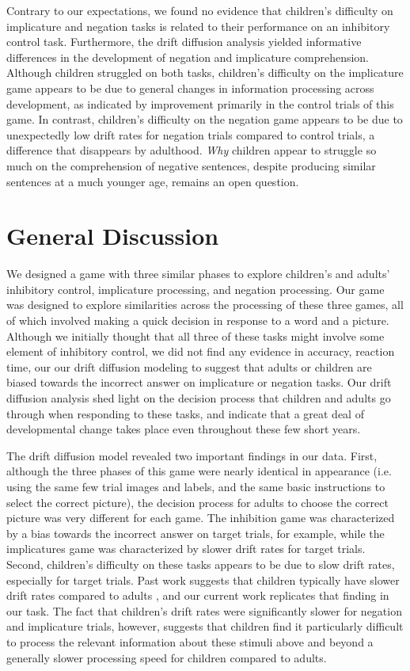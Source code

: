 \documentclass[10pt,letterpaper]{article}
\begin{document}
Contrary to our expectations, we found no evidence that children's difficulty on implicature and negation tasks is related to their performance on an inhibitory control task.  Furthermore, the drift diffusion analysis yielded informative differences in the development of negation and implicature comprehension.  Although children struggled on both tasks, children's difficulty on the implicature game appears to be due to general changes in information processing across development, as indicated by improvement primarily in the control trials of this game.  In contrast, children's difficulty on the negation game appears to be due to unexpectedly low drift rates for negation trials compared to control trials, a difference that disappears by adulthood.  \emph{Why} children appear to struggle so much on the comprehension of negative sentences, despite producing similar sentences at a much younger age, remains an open question.  


\section{General Discussion}

We designed a game with three similar phases to explore children's and adults' inhibitory control, implicature processing, and negation processing.  Our game was designed to explore similarities across the processing of these three games, all of which involved making a quick decision in response to a word and a picture.  Although we initially thought that all three of these tasks might involve some element of inhibitory control, we did not find any evidence in accuracy, reaction time, our our drift diffusion modeling to suggest that adults or children are biased towards the incorrect answer on implicature or negation tasks.  Our drift diffusion analysis shed light on the decision process that children and adults go through when responding to these tasks, and indicate that a great deal of developmental change takes place even throughout these few short years.

The drift diffusion model revealed two important findings in our data.  First, although the three phases of this game were nearly identical in appearance (i.e. using the same few trial images and labels, and the same basic instructions to select the correct picture), the decision process for adults to choose the correct picture was very different for each game.  The inhibition game was characterized by a bias towards the incorrect answer on target trials, for example, while the implicatures game was characterized by slower drift rates for target trials.  Second, children's difficulty on these tasks appears to be due to slow drift rates, especially for target trials.  Past work suggests that children typically have slower drift rates compared to adults \cite{ratcliff2012}, and our current work replicates that finding in our task.  The fact that children's drift rates were significantly slower for negation and implicature trials, however, suggests that children find it particularly difficult to process the relevant information about these stimuli above and beyond a generally slower processing speed for children compared to adults.
\end{document}
